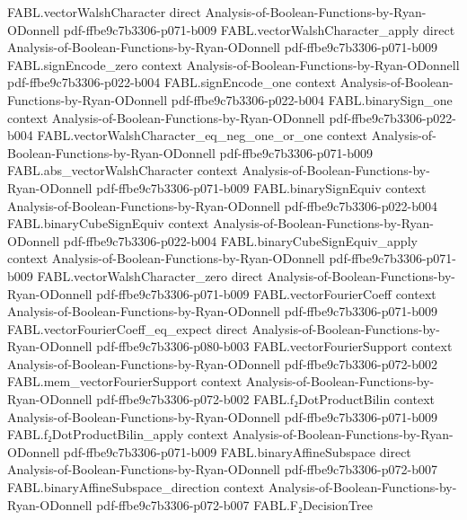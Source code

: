 \begin{theorem}
  {FABL.vectorWalshCharacter}
  {direct}
  {Analysis-of-Boolean-Functions-by-Ryan-ODonnell}
  {pdf-ffbe9c7b3306-p071-b009}
\proofstep
  {FABL.vectorWalshCharacter_apply}
  {direct}
  {Analysis-of-Boolean-Functions-by-Ryan-ODonnell}
  {pdf-ffbe9c7b3306-p071-b009}
\proofstep
  {FABL.signEncode_zero}
  {context}
  {Analysis-of-Boolean-Functions-by-Ryan-ODonnell}
  {pdf-ffbe9c7b3306-p022-b004}
\proofstep
  {FABL.signEncode_one}
  {context}
  {Analysis-of-Boolean-Functions-by-Ryan-ODonnell}
  {pdf-ffbe9c7b3306-p022-b004}
\proofstep
  {FABL.binarySign_one}
  {context}
  {Analysis-of-Boolean-Functions-by-Ryan-ODonnell}
  {pdf-ffbe9c7b3306-p022-b004}
\proofstep
  {FABL.vectorWalshCharacter_eq_neg_one_or_one}
  {context}
  {Analysis-of-Boolean-Functions-by-Ryan-ODonnell}
  {pdf-ffbe9c7b3306-p071-b009}
\proofstep
  {FABL.abs_vectorWalshCharacter}
  {context}
  {Analysis-of-Boolean-Functions-by-Ryan-ODonnell}
  {pdf-ffbe9c7b3306-p071-b009}
\proofstep
  {FABL.binarySignEquiv}
  {context}
  {Analysis-of-Boolean-Functions-by-Ryan-ODonnell}
  {pdf-ffbe9c7b3306-p022-b004}
\proofstep
  {FABL.binaryCubeSignEquiv}
  {context}
  {Analysis-of-Boolean-Functions-by-Ryan-ODonnell}
  {pdf-ffbe9c7b3306-p022-b004}
\proofstep
  {FABL.binaryCubeSignEquiv_apply}
  {context}
  {Analysis-of-Boolean-Functions-by-Ryan-ODonnell}
  {pdf-ffbe9c7b3306-p071-b009}
\proofstep
  {FABL.vectorWalshCharacter_zero}
  {direct}
  {Analysis-of-Boolean-Functions-by-Ryan-ODonnell}
  {pdf-ffbe9c7b3306-p071-b009}
\proofstep
  {FABL.vectorFourierCoeff}
  {context}
  {Analysis-of-Boolean-Functions-by-Ryan-ODonnell}
  {pdf-ffbe9c7b3306-p071-b009}
\proofstep
  {FABL.vectorFourierCoeff_eq_expect}
  {direct}
  {Analysis-of-Boolean-Functions-by-Ryan-ODonnell}
  {pdf-ffbe9c7b3306-p080-b003}
\proofstep
  {FABL.vectorFourierSupport}
  {context}
  {Analysis-of-Boolean-Functions-by-Ryan-ODonnell}
  {pdf-ffbe9c7b3306-p072-b002}
\proofstep
  {FABL.mem_vectorFourierSupport}
  {context}
  {Analysis-of-Boolean-Functions-by-Ryan-ODonnell}
  {pdf-ffbe9c7b3306-p072-b002}
\proofstep
  {FABL.f₂DotProductBilin}
  {context}
  {Analysis-of-Boolean-Functions-by-Ryan-ODonnell}
  {pdf-ffbe9c7b3306-p071-b009}
\proofstep
  {FABL.f₂DotProductBilin_apply}
  {context}
  {Analysis-of-Boolean-Functions-by-Ryan-ODonnell}
  {pdf-ffbe9c7b3306-p071-b009}
\proofstep
  {FABL.binaryAffineSubspace}
  {direct}
  {Analysis-of-Boolean-Functions-by-Ryan-ODonnell}
  {pdf-ffbe9c7b3306-p072-b007}
\proofstep
  {FABL.binaryAffineSubspace_direction}
  {context}
  {Analysis-of-Boolean-Functions-by-Ryan-ODonnell}
  {pdf-ffbe9c7b3306-p072-b007}
\proofstep
  {FABL.F₂DecisionTree}

\end{theorem}

